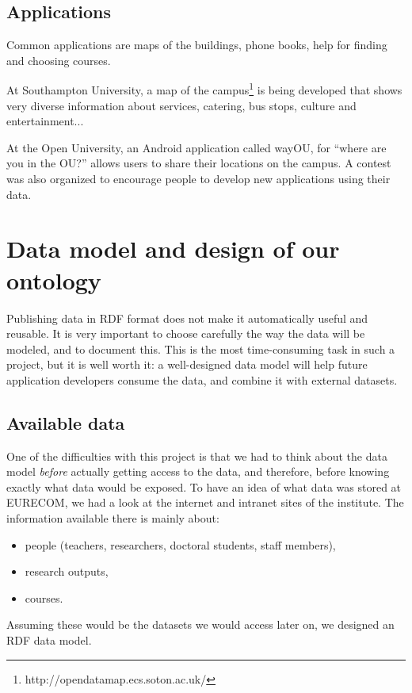 \documentclass[a4paper,11pt]{report}
\begin{document}
\section{Applications}
Common applications are maps of the buildings, phone books, help for finding and choosing courses. 

At Southampton University, a map of the campus\footnote{http://opendatamap.ecs.soton.ac.uk/} is being developed that shows very diverse information about services, catering, bus stops, culture and entertainment... 

At the Open University, an Android application called wayOU, for ``where are you in the OU?'' allows users to share their locations on the campus. A contest was also organized to encourage people to develop new applications using their data. 

\chapter{Data model and design of our ontology}
Publishing data in RDF format does not make it automatically useful and reusable. It is very important to choose carefully the way the data will be modeled, and to document this. This is the most time-consuming task in such a project, but it is well worth it: a well-designed data model will help future application developers consume the data, and combine it with external datasets. 
\section{Available data}
One of the difficulties with this project is that we had to think about the data model \emph{before} actually getting access to the data, and therefore, before knowing exactly what data would be exposed. To have an idea of what data was stored at \mbox{EURECOM}, we had a look at the internet and intranet sites of the institute. The information available there is mainly about: 
\begin{itemize}
\item people (teachers, researchers, doctoral students, staff members), 
\item research outputs, 
\item courses. 
\end{itemize}
Assuming these would be the datasets we would access later on, we designed an RDF data model. %
 
\end{document}
